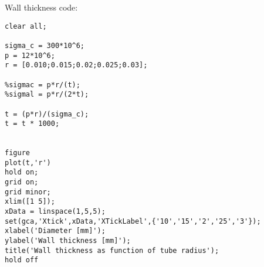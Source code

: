 Wall thickness code:

\begin{lstlisting}
clear all;

sigma_c = 300*10^6;
p = 12*10^6;
r = [0.010;0.015;0.02;0.025;0.03];

%sigmac = p*r/(t);
%sigmal = p*r/(2*t);

t = (p*r)/(sigma_c);
t = t * 1000;


figure
plot(t,'r')
hold on;
grid on;
grid minor;
xlim([1 5]);
xData = linspace(1,5,5);
set(gca,'Xtick',xData,'XTickLabel',{'10','15','2','25','3'});
xlabel('Diameter [mm]');
ylabel('Wall thickness [mm]');
title('Wall thickness as function of tube radius');
hold off
\end{lstlisting}
